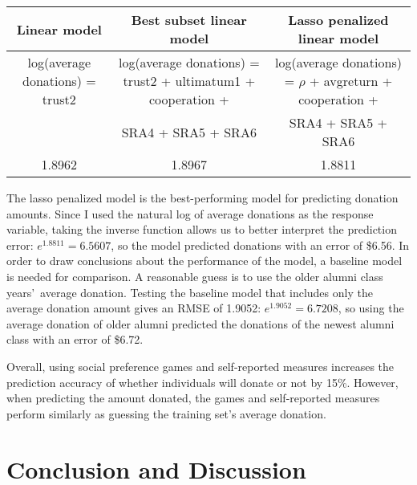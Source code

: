 \documentclass[12pt]{article}
\begin{document}
\vspace{5mm} \begin{adjustbox}{width=\textwidth}
\begin{tabular}{ c | c | c }
\hline \hline
Linear model & Best subset linear model & Lasso penalized linear model \\
\hline
log(average donations) = trust2 & log(average donations) = trust2 + ultimatum1 + cooperation + & log(average donations) = \(\rho\) + avgreturn + cooperation + \\
\small &  SRA4 + SRA5 + SRA6 & SRA4 + SRA5 + SRA6 \\
\hline
1.8962 & 1.8967 & 1.8811 \\
\hline \hline
\end{tabular}
\end{adjustbox}


\vspace{5mm} The lasso penalized model is the best-performing model for predicting donation amounts. Since I used the natural log of average donations as the response variable, taking the inverse function allows us to better interpret the prediction error: \(e^{1.8811} = 6.5607\), so the model predicted donations with an error of \$6.56. In order to draw conclusions about the performance of the model, a baseline model is needed for comparison. A reasonable guess is to use the older alumni class years\rq \ average donation. Testing the baseline model that includes only the average donation amount gives an RMSE of 1.9052: \(e^{1.9052} = 6.7208\), so using the average donation of older alumni predicted the donations of the newest alumni class with an error of \$6.72. 


Overall, using social preference games and self-reported measures increases the prediction accuracy of whether individuals will donate or not by 15\%. However, when predicting the amount donated, the games and self-reported measures perform similarly as guessing the training set\rq s average donation.


\section{Conclusion and Discussion}
\end{document}
